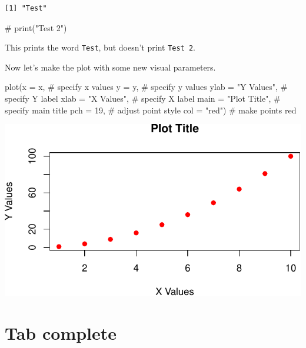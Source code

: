 \documentclass[
  letterpaper,
  DIV=11,
  numbers=noendperiod]{scrreprt}
\newenvironment{Shaded}{\begin{snugshade}}{\end{snugshade}}
\newcommand{\AttributeTok}[1]{\textcolor[rgb]{0.40,0.45,0.13}{#1}}
\newcommand{\CommentTok}[1]{\textcolor[rgb]{0.37,0.37,0.37}{#1}}
\newcommand{\DecValTok}[1]{\textcolor[rgb]{0.68,0.00,0.00}{#1}}
\newcommand{\FunctionTok}[1]{\textcolor[rgb]{0.28,0.35,0.67}{#1}}
\newcommand{\NormalTok}[1]{\textcolor[rgb]{0.00,0.23,0.31}{#1}}
\newcommand{\StringTok}[1]{\textcolor[rgb]{0.13,0.47,0.30}{#1}}
\begin{document}
\begin{verbatim}
[1] "Test"
\end{verbatim}

\begin{Shaded}
\begin{Highlighting}[]
\CommentTok{\# print("Test 2")}
\end{Highlighting}
\end{Shaded}

This prints the word \texttt{Test}, but doesn't print \texttt{Test\ 2}.

Now let's make the plot with some new visual parameters.

\begin{Shaded}
\begin{Highlighting}[]
\FunctionTok{plot}\NormalTok{(}\AttributeTok{x =}\NormalTok{ x, }\CommentTok{\# specify x values}
     \AttributeTok{y =}\NormalTok{ y, }\CommentTok{\# specify y values}
     \AttributeTok{ylab =} \StringTok{"Y Values"}\NormalTok{, }\CommentTok{\# specify Y label}
     \AttributeTok{xlab =} \StringTok{"X Values"}\NormalTok{, }\CommentTok{\# specify X label}
     \AttributeTok{main =} \StringTok{"Plot Title"}\NormalTok{, }\CommentTok{\# specify main title}
     \AttributeTok{pch =} \DecValTok{19}\NormalTok{, }\CommentTok{\# adjust point style}
     \AttributeTok{col =} \StringTok{"red"}\NormalTok{) }\CommentTok{\# make points red}
\end{Highlighting}
\end{Shaded}

\includegraphics{intro_to_r_files/figure-pdf/unnamed-chunk-7-1.pdf}

\section{Tab complete}\label{tab-complete}
\end{document}
